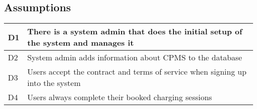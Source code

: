\subsection{Assumptions}
\begin{tabular}{|l|l|}
	\hline
	D1 & There is a system admin that does the initial setup of the system and manages it\\
	\hline
	D2 & System admin adds information about CPMS to the database\\
	\hline
	D3 & Users accept the contract and terms of service when signing up into the system\\
	\hline
	D4 & Users always complete their booked charging sessions\\
	\hline
\end{tabular}





















